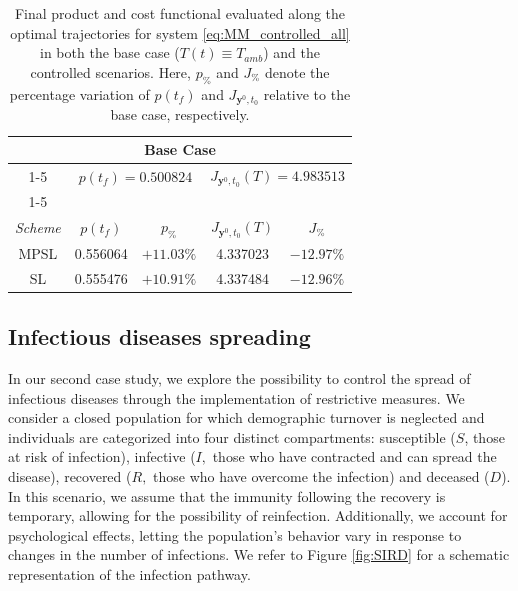 \documentclass[10pt]{article}
\theoremstyle{remark}
\theoremstyle{definition}
\theoremstyle{remark}
\begin{document}
\begin{table}[H]
    \centering    
\begin{tabular}{|c|c|c|c|c|}
    \multicolumn{5}{c}{Base Case} \\
    \cline{1-5}
      & \multicolumn{2}{c|}{$p(t_f)=0.500824$} & \multicolumn{2}{c|}{$J_{\bm{y}^0,t_0} (T)=4.983513$ } \\ 
    \cline{1-5} 
    \multicolumn{5}{c}{\rule{0pt}{0.6cm}Optimal Control Setting} \\
     \hline
    \textit{Scheme} & $p(t_f)$ & $p_{\%}$ & $J_{\bm{y}^0,t_0} (T)$ & $J_{\%}$ \\
    \hline
    MPSL & 0.556064 & $+11.03\%$ & 4.337023 & $-12.97\%$\\
    \hline
    SL & 0.555476 & $+10.91\%$  & 4.337484 & $-12.96\%$\\
    \hline
\end{tabular}
\caption{Final product and cost functional evaluated along the optimal trajectories for system \eqref{eq:MM_controlled_all} in both the base case ($T(t) \equiv T_{amb}$) and the controlled scenarios. Here, $p_{\%}$ and $J_{\%}$ denote the percentage variation of $p(t_f)$ and $J_{\bm{y}^0,t_0}$ relative to the base case, respectively.}
\label{tab:costi_chimica}
\end{table}


\subsection{Infectious diseases spreading}
In our second case study, we explore the possibility to control the spread of infectious diseases through the implementation of restrictive measures. We consider a closed population for which demographic turnover is neglected and individuals are categorized into four distinct compartments: susceptible ($S$, those at risk of infection), infective ($I,$ those who have contracted and can spread the disease), recovered ($R,$ those who have overcome the infection) and deceased ($D$). In this scenario, we assume that the immunity following the recovery is temporary, allowing for the possibility of reinfection. Additionally, we account for psychological effects, letting the population's behavior vary in response to changes in the number of infections. We refer to Figure \ref{fig:SIRD}  for a schematic representation of the infection pathway.
\end{document}
